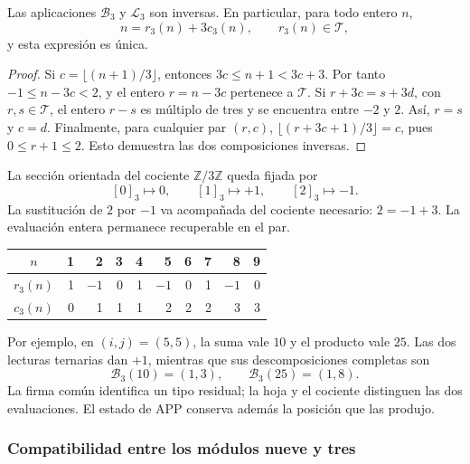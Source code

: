 \begin{proposicion}
\label{trit:prop:restitucion}
Las aplicaciones \(\mathcal B_3\) y \(\mathcal L_3\) son inversas.
En particular, para todo entero \(n\),
\[
 n=r_3(n)+3c_3(n),\qquad r_3(n)\in\mathcal T,
\]
y esta expresión es única.
\end{proposicion}
\begin{proof}
Si \(c=\lfloor(n+1)/3\rfloor\), entonces
\(3c\le n+1<3c+3\). Por tanto \(-1\le n-3c<2\), y el entero
\(r=n-3c\) pertenece a \(\mathcal T\). Si
\(r+3c=s+3d\), con \(r,s\in\mathcal T\), el entero \(r-s\) es múltiplo
de tres y se encuentra entre \(-2\) y \(2\). Así, \(r=s\) y \(c=d\).
Finalmente, para cualquier par \((r,c)\),
\(\lfloor(r+3c+1)/3\rfloor=c\), pues \(0\le r+1\le2\).
Esto demuestra las dos composiciones inversas.
\end{proof}

La sección orientada del cociente \(\mathbb Z/3\mathbb Z\) queda fijada por
\[
 [0]_3\longmapsto0,\qquad [1]_3\longmapsto+1,
 \qquad [2]_3\longmapsto-1.
\]
La sustitución de \(2\) por \(-1\) va acompañada del cociente necesario:
\(2=-1+3\). La evaluación entera permanece recuperable en el par.

\begin{tablacompleta}
\caption{Descomposición balanceada de las nueve posiciones de una recta APP.}
\label{trit:tabla:nueve}
\begin{tabular}{c*{9}{r}}
\toprule
\(n\)&1&2&3&4&5&6&7&8&9\\
\midrule
\(r_3(n)\)&1&$-1$&0&1&$-1$&0&1&$-1$&0\\
\(c_3(n)\)&0&1&1&1&2&2&2&3&3\\
\bottomrule
\end{tabular}
\end{tablacompleta}

Por ejemplo, en \((i,j)=(5,5)\), la suma vale \(10\) y el producto vale
\(25\). Las dos lecturas ternarias dan \(+1\), mientras que sus
descomposiciones completas son
\[
 \mathcal B_3(10)=(1,3),\qquad
 \mathcal B_3(25)=(1,8).
\]
La firma común identifica un tipo residual; la hoja y el cociente distinguen
las dos evaluaciones. El estado de APP conserva además la posición que las
produjo.

\subsubsection{Compatibilidad entre los módulos nueve y tres}

